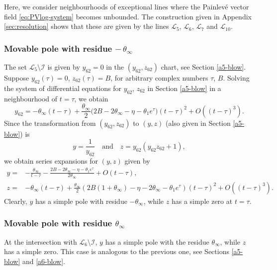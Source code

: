 Here, we consider neighbourhoods of exceptional lines where the Painlev\'e vector field \eqref{eq:PVlog-system} becomes unbounded.
The construction given in Appendix \ref{sec:resolution} shows that these are given by the lines $\mathcal{L}_5$, $\mathcal{L}_6$, $\mathcal{L}_7$ and $\mathcal{L}_{10}$.

\subsubsection*{Movable pole with residue $-\,\theta_{\infty}$} The set $\mathcal{L}_5\setminus\mathcal{I}$ is given by $y_{62}=0$ in the $(y_{62},z_{62})$ chart, see Section \ref{a5-blow}.
Suppose $y_{62}(\tau)=0$, $z_{62}(\tau)=B$, for arbitrary complex numbers $\tau$, $B$.
Solving the system of differential equations for $y_{62}$, $z_{62}$ in Section \ref{a5-blow} in a neighbourhood of $t=\tau$, we obtain
$$
y_{62}=-\theta_{\infty}(t-\tau)+\frac{\theta_{\infty}}{2}\big(2 B-2\theta_{\infty}-\eta-\theta_1e^{\tau}\big)(t-\tau)^2+O((t-\tau)^3).
$$
Since the transformation from $(y_{62}, z_{62})$ to $(y, z)$ (also given in Section \ref{a5-blow}) is
$$
y=\frac1{y_{62}}
\quad\text{and}\quad
z=y_{62}(y_{62}z_{62}+1),
$$ 
we obtain series expansions for $(y, z)$ given by
$$
\begin{aligned}
y= & -\frac{\theta_{\infty}}{t-\tau}-\frac{2 B-2\theta_{\infty}-\eta-\theta_1e^{\tau}}{2\theta_{\infty}}+O(t-\tau),
\\
z= & -\theta_{\infty}(t-\tau)
 +
\frac{\theta_{\infty}}{2}\left(
2B(1+\theta_{\infty})-\eta-2\theta_{\infty}-\theta_1 e^{\tau}
\right)(t-\tau)^2
+O((t-\tau)^3).
\end{aligned}
$$
Clearly, $y$ has a simple pole with residue $-\theta_{\infty}$,  while $z$ has a simple zero at $t=\tau$.

\subsubsection*{Movable pole with residue $\theta_{\infty}$} At the intersection with $\mathcal{L}_6\setminus\mathcal{I}$, $y$ has a simple pole with the residue $\theta_{\infty}$, while $z$ has a simple zero.
This case is analogous to the previous one, see Sections \ref{a5-blow} and \ref{a6-blow}.


